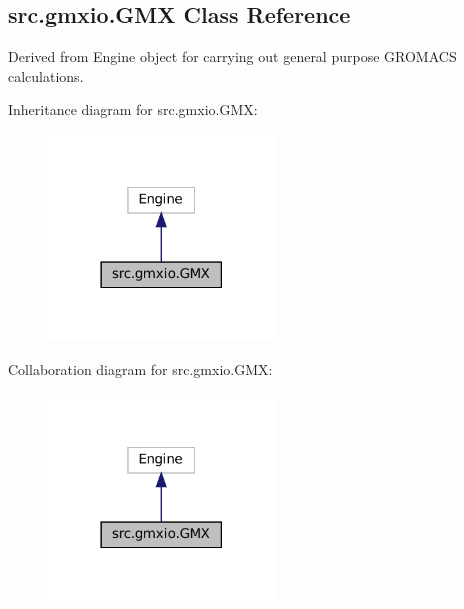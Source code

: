 \hypertarget{classsrc_1_1gmxio_1_1GMX}{}\subsection{src.\+gmxio.\+G\+MX Class Reference}
\label{classsrc_1_1gmxio_1_1GMX}


Derived from Engine object for carrying out general purpose G\+R\+O\+M\+A\+CS calculations.  




Inheritance diagram for src.\+gmxio.\+G\+MX\+:
\nopagebreak
\begin{figure}[H]
\begin{center}
\leavevmode
\includegraphics[width=170pt]{classsrc_1_1gmxio_1_1GMX__inherit__graph}
\end{center}
\end{figure}


Collaboration diagram for src.\+gmxio.\+G\+MX\+:
\nopagebreak
\begin{figure}[H]
\begin{center}
\leavevmode
\includegraphics[width=170pt]{classsrc_1_1gmxio_1_1GMX__coll__graph}
\end{center}
\end{figure}
